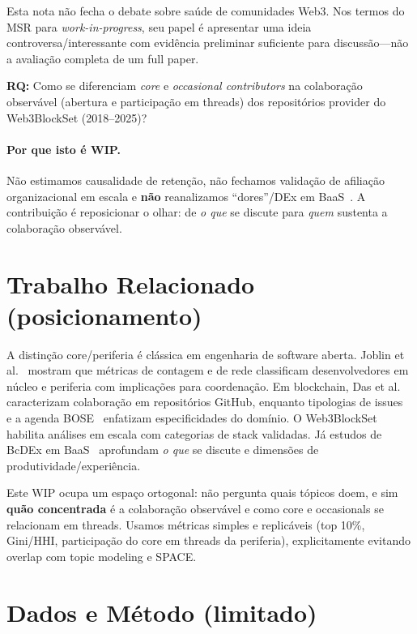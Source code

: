 \documentclass[10pt,conference]{IEEEtran}
\begin{document}
Esta nota não fecha o debate sobre saúde de comunidades Web3. Nos termos do MSR para \emph{work-in-progress}, seu papel é apresentar uma ideia controversa/interessante com evidência preliminar suficiente para discussão---não a avaliação completa de um full paper.

\textbf{RQ:} Como se diferenciam \emph{core} e \emph{occasional contributors} na colaboração observável (abertura e participação em threads) dos repositórios provider do Web3BlockSet (2018--2025)?

\paragraph{Por que isto é WIP.}
Não estimamos causalidade de retenção, não fechamos validação de afiliação organizacional em escala e \textbf{não} reanalizamos ``dores''/DEx em BaaS~\cite{soares2025bcdex}. A contribuição é reposicionar o olhar: de \emph{o que} se discute para \emph{quem} sustenta a colaboração observável.

\section{Trabalho Relacionado (posicionamento)}

A distinção core/periferia é clássica em engenharia de software aberta. Joblin et al.~\cite{joblin2017classifying} mostram que métricas de contagem e de rede classificam desenvolvedores em núcleo e periferia com implicações para coordenação. Em blockchain, Das et al.~\cite{das2022blockchain} caracterizam colaboração em repositórios GitHub, enquanto tipologias de issues~\cite{opu2025issuetypes} e a agenda BOSE~\cite{porru2017bose} enfatizam especificidades do domínio. O Web3BlockSet~\cite{soares2026web3blockset} habilita análises em escala com categorias de stack validadas. Já estudos de BcDEx em BaaS~\cite{soares2025bcdex} aprofundam \emph{o que} se discute e dimensões de produtividade/experiência.

Este WIP ocupa um espaço ortogonal: não pergunta quais tópicos doem, e sim \textbf{quão concentrada} é a colaboração observável e como core e occasionals se relacionam em threads. Usamos métricas simples e replicáveis (top 10\%, Gini/HHI, participação do core em threads da periferia), explicitamente evitando overlap com topic modeling e SPACE.

\section{Dados e Método (limitado)}
\end{document}
